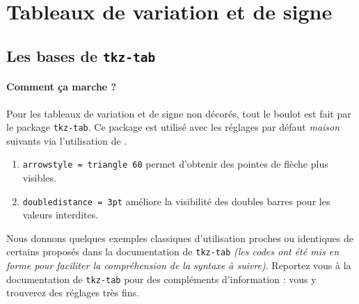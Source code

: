 \documentclass[12pt,a4paper]{article}
\begin{document}

\section{Tableaux de variation et de signe}

\subsection{Les bases de \texttt{tkz-tab}}

\paragraph{Comment ça marche ?}

Pour les tableaux de variation et de signe non décorés, tout le boulot est fait par le package \verb+tkz-tab+.
Ce package est utilisé avec les réglages par défaut \emph{\og maison \fg} suivants via l'utilisation de .

\begin{enumerate}
	\item \verb+arrowstyle = triangle 60+ permet d'obtenir des pointes de flèche plus visibles.
	
	\item \verb+doubledistance = 3pt+ améliore la visibilité des doubles barres pour les valeurs interdites.
\end{enumerate}


 

\medskip

Nous donnons quelques exemples classiques d'utilisation proches ou identiques de certains proposés dans la documentation de \verb+tkz-tab+ \emph{(les codes ont été mis en forme pour faciliter la compréhension de la syntaxe à suivre)}.
Reportez vous à la documentation de \verb+tkz-tab+ pour des compléments d'information : vous y trouverez des réglages très fins.










\end{document}
